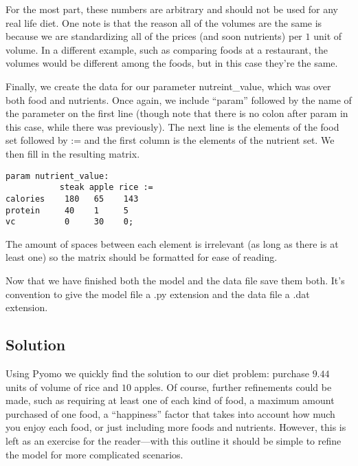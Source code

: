 \documentclass{article}
\begin{document}
For the most part, these numbers are arbitrary and should not be used for any real life diet.  One note is that the reason all of the volumes are the same is because we are standardizing all of the prices (and soon nutrients) per $1$ unit of volume.  In a different example, such as comparing foods at a restaurant, the volumes would be different among the foods, but in this case they're the same.

Finally, we create the data for our parameter nutreint\_value, which was over both food and nutrients.  Once again, we include ``param'' followed by the name of the parameter on the first line (though note that there is no colon after param in this case, while there was previously).  The next line is the elements of the food set followed by := and the first column is the elements of the nutrient set.  We then fill in the resulting matrix.

\begin{verbatim}
param nutrient_value:
           steak apple rice :=
calories    180   65    143
protein     40    1     5
vc          0     30    0;
\end{verbatim}

The amount of spaces between each element is irrelevant (as long as there is at least one) so the matrix should be formatted for ease of reading.

Now that we have finished both the model and the data file save them both. It's convention to give the model file a .py extension and the data file a .dat extension.  

\subsection*{Solution}

Using Pyomo we quickly find the solution to our diet problem: purchase $9.44$ units of volume of rice and $10$ apples. Of course, further refinements could be made, such as requiring at least one of each kind of food, a maximum amount purchased of one food, a ``happiness'' factor that takes into account how much you enjoy each food, or just including more foods and nutrients.  However, this is left as an exercise for the reader---with this outline it should be simple to refine the model for more complicated scenarios.
\end{document}
